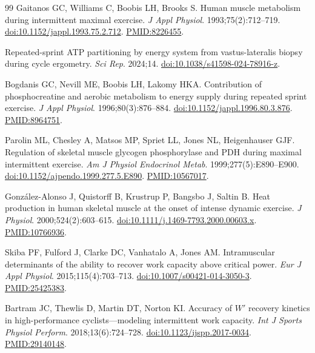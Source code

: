 \documentclass[11pt,a4paper]{article}
\newcommand{\Wp}{\ensuremath{W'}}
\begin{document}
\begin{thebibliography}{99}
 Gaitanos GC, Williams C, Boobis LH, Brooks S. Human muscle metabolism during
intermittent maximal exercise. \emph{J Appl Physiol}. 1993;75(2):712--719.
\href{https://doi.org/10.1152/jappl.1993.75.2.712}{doi:10.1152/jappl.1993.75.2.712}.
\href{https://pubmed.ncbi.nlm.nih.gov/8226455/}{PMID:8226455}.

 Repeated-sprint ATP partitioning by energy system from vastus-lateralis biopsy during
cycle ergometry. \emph{Sci Rep}. 2024;14.
\href{https://doi.org/10.1038/s41598-024-78916-z}{doi:10.1038/s41598-024-78916-z}.

 Bogdanis GC, Nevill ME, Boobis LH, Lakomy HKA. Contribution of phosphocreatine and
aerobic metabolism to energy supply during repeated sprint exercise. \emph{J Appl Physiol}.
1996;80(3):876--884. \href{https://doi.org/10.1152/jappl.1996.80.3.876}{doi:10.1152/jappl.1996.80.3.876}.
\href{https://pubmed.ncbi.nlm.nih.gov/8964751/}{PMID:8964751}.

 Parolin ML, Chesley A, Matsos MP, Spriet LL, Jones NL, Heigenhauser GJF. Regulation
of skeletal muscle glycogen phosphorylase and PDH during maximal intermittent exercise. \emph{Am J Physiol
Endocrinol Metab}. 1999;277(5):E890--E900.
\href{https://doi.org/10.1152/ajpendo.1999.277.5.E890}{doi:10.1152/ajpendo.1999.277.5.E890}.
\href{https://pubmed.ncbi.nlm.nih.gov/10567017/}{PMID:10567017}.

 Gonz\'alez-Alonso J, Quistorff B, Krustrup P, Bangsbo J, Saltin B. Heat
production in human skeletal muscle at the onset of intense dynamic exercise. \emph{J Physiol}.
2000;524(2):603--615. \href{https://doi.org/10.1111/j.1469-7793.2000.00603.x}{doi:10.1111/j.1469-7793.2000.00603.x}.
\href{https://pubmed.ncbi.nlm.nih.gov/10766936/}{PMID:10766936}.

 Skiba PF, Fulford J, Clarke DC, Vanhatalo A, Jones AM. Intramuscular determinants of
the ability to recover work capacity above critical power. \emph{Eur J Appl Physiol}.
2015;115(4):703--713. \href{https://doi.org/10.1007/s00421-014-3050-3}{doi:10.1007/s00421-014-3050-3}.
\href{https://pubmed.ncbi.nlm.nih.gov/25425383/}{PMID:25425383}.

 Bartram JC, Thewlis D, Martin DT, Norton KI. Accuracy of \Wp{} recovery kinetics in
high-performance cyclists---modeling intermittent work capacity. \emph{Int J Sports Physiol Perform}.
2018;13(6):724--728. \href{https://doi.org/10.1123/ijspp.2017-0034}{doi:10.1123/ijspp.2017-0034}.
\href{https://pubmed.ncbi.nlm.nih.gov/29140148/}{PMID:29140148}.


\end{thebibliography}
\end{document}
